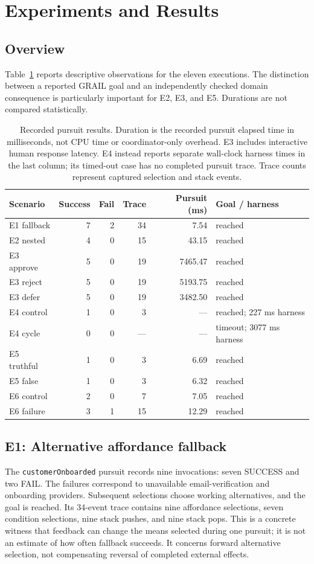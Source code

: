\documentclass[11pt]{article}
\begin{document}
\section{Experiments and Results}
\subsection{Overview}
Table~\ref{tab:results} reports descriptive observations for the eleven executions. The distinction between a reported GRAIL goal and an independently checked domain consequence is particularly important for E2, E3, and E5. Durations are not compared statistically.

\begin{table}[ht]
\centering\small
\caption{Recorded pursuit results. Duration is the recorded pursuit elapsed time in milliseconds, not CPU time or coordinator-only overhead. E3 includes interactive human response latency. E4 instead reports separate wall-clock harness times in the last column; its timed-out case has no completed pursuit trace. Trace counts represent captured selection and stack events.}
\label{tab:results}
\begin{tabular}{@{}lrrrrl@{}}
\toprule
Scenario & Success & Fail & Trace & Pursuit (ms) & Goal / harness \\
\midrule
E1 fallback & 7 & 2 & 34 & 7.54 & reached \\
E2 nested & 4 & 0 & 15 & 43.15 & reached \\
E3 approve & 5 & 0 & 19 & 7465.47 & reached \\
E3 reject & 5 & 0 & 19 & 5193.75 & reached \\
E3 defer & 5 & 0 & 19 & 3482.50 & reached \\
E4 control & 1 & 0 & 3 & --- & reached; 227 ms harness \\
E4 cycle & 0 & 0 & --- & --- & timeout; 3077 ms harness \\
E5 truthful & 1 & 0 & 3 & 6.69 & reached \\
E5 false & 1 & 0 & 3 & 6.32 & reached \\
E6 control & 2 & 0 & 7 & 7.05 & reached \\
E6 failure & 3 & 1 & 15 & 12.29 & reached \\
\bottomrule
\end{tabular}
\end{table}

\subsection{E1: Alternative affordance fallback}
The \texttt{customerOnboarded} pursuit records nine invocations: seven SUCCESS and two FAIL. The failures correspond to unavailable email-verification and onboarding providers. Subsequent selections choose working alternatives, and the goal is reached. Its 34-event trace contains nine affordance selections, seven condition selections, nine stack pushes, and nine stack pops. This is a concrete witness that feedback can change the means selected during one pursuit; it is not an estimate of how often fallback succeeds. It concerns forward alternative selection, not compensating reversal of completed external effects.
\end{document}
